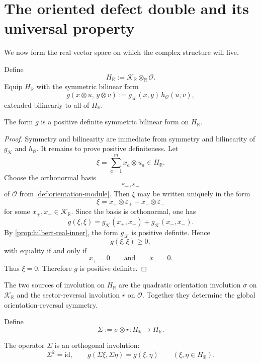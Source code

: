 \section{The oriented defect double and its universal property}
\label{sec:hilbert-oriented-double}
We now form the real vector space on which the complex structure will
live.
\begin{definition}
	Define
	\[
		H_{\mathbb R}:=\mathcal K_{\mathbb R}\otimes_{\mathbb R}\mathcal O.
	\]
	Equip \(H_{\mathbb R}\) with the symmetric bilinear form
	\[
		g(x\otimes u,\,y\otimes v)
		:=
		g_{\mathcal K}(x,y)\,h_{\mathcal O}(u,v),
	\]
	extended bilinearly to all of \(H_{\mathbb R}\).
\end{definition}
\begin{proposition}
	The form \(g\) is a positive definite symmetric bilinear form on
	\(H_{\mathbb R}\).
\end{proposition}
\begin{proof}
	Symmetry and bilinearity are immediate from symmetry and bilinearity of
	\(g_{\mathcal K}\) and \(h_{\mathcal O}\).
	It remains to prove positive definiteness.
	Let
	\[
		\xi=\sum_{a=1}^{m} x_a\otimes u_a\in H_{\mathbb R}.
	\]
	Choose the orthonormal basis
	\[
		\varepsilon_{+},\varepsilon_{-}
	\]
	of \(\mathcal O\) from \cref{def:orientation-module}.
	Then \(\xi\) may be written uniquely in the form
	\[
		\xi=x_{+}\otimes \varepsilon_{+}+x_{-}\otimes \varepsilon_{-}
	\]
	for some \(x_{+},x_{-}\in\mathcal K_{\mathbb R}\).
	Since the basis is orthonormal, one has
	\[
		g(\xi,\xi)
		=
		g_{\mathcal K}(x_{+},x_{+})+g_{\mathcal K}(x_{-},x_{-}).
	\]
	By \cref{prop:hilbert-real-inner}, the form \(g_{\mathcal K}\) is
	positive definite.
	Hence
	\[
		g(\xi,\xi)\ge 0,
	\]
	with equality if and only if
	\[
		x_{+}=0
		\qquad\text{and}\qquad
		x_{-}=0.
	\]
	Thus \(\xi=0\).
	Therefore \(g\) is positive definite.
\end{proof}
The two sources of involution on \(H_{\mathbb R}\) are the quadratic
orientation involution \(\sigma\) on \(\mathcal K_{\mathbb R}\) and the
sector-reversal involution \(r\) on \(\mathcal O\).
Together they determine the global orientation-reversal symmetry.
\begin{definition}
	Define
	\[
		\Sigma:=\sigma\otimes r
		:
		H_{\mathbb R}\to H_{\mathbb R}.
	\]
\end{definition}
\begin{proposition}
	The operator \(\Sigma\) is an orthogonal involution:
	\[
		\Sigma^{2}=\mathrm{id},
		\qquad
		g(\Sigma\xi,\Sigma\eta)=g(\xi,\eta)
		\qquad
		(\xi,\eta\in H_{\mathbb R}).
	\]
\end{proposition}
